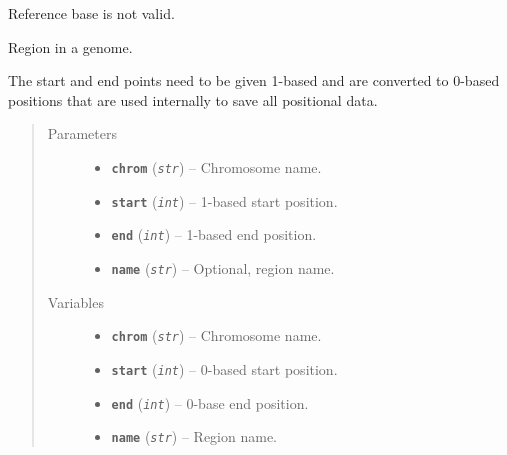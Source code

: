 \documentclass[letterpaper,10pt,english]{sphinxmanual}
\begin{document}
\begin{fulllineitems}
\label{seqbase:libPoMo.seqbase.NotAValidRefBase}
Reference base is not valid.

\end{fulllineitems}


\begin{fulllineitems}
\label{seqbase:libPoMo.seqbase.Region}
Region in a genome.

The start and end points need to be given 1-based and are
converted to 0-based positions that are used internally to save
all positional data.
\begin{quote}\begin{description}
\item[{Parameters}] \leavevmode\begin{itemize}
\item {} 
\textbf{\texttt{chrom}} (\emph{\texttt{str}}) -- Chromosome name.

\item {} 
\textbf{\texttt{start}} (\emph{\texttt{int}}) -- 1-based start position.

\item {} 
\textbf{\texttt{end}} (\emph{\texttt{int}}) -- 1-based end position.

\item {} 
\textbf{\texttt{name}} (\emph{\texttt{str}}) -- Optional, region name.

\end{itemize}

\item[{Variables}] \leavevmode\begin{itemize}
\item {} 
\textbf{\texttt{chrom}} (\emph{\texttt{str}}) -- Chromosome name.

\item {} 
\textbf{\texttt{start}} (\emph{\texttt{int}}) -- 0-based start position.

\item {} 
\textbf{\texttt{end}} (\emph{\texttt{int}}) -- 0-base end position.

\item {} 
\textbf{\texttt{name}} (\emph{\texttt{str}}) -- Region name.


\end{itemize}
\end{description}
\end{quote}
\end{fulllineitems}
\end{document}
